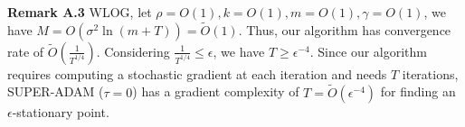 \documentclass{article}
\begin{document}
\textbf{Remark A.3} WLOG, let $\rho = O(1), k = O(1), m = O(1), \gamma = O(1)$, we have $M = O(\sigma^2 \ln(m+T)) = \tilde{O}(1)$. Thus, our algorithm has convergence rate of $\tilde{O}\left(\frac{1}{T^{1/4}}\right)$.
Considering $\frac{1}{T^{1/4}}\leq\epsilon$, we have $T\geq\epsilon^{-4}$. Since our algorithm requires computing a stochastic gradient at each iteration and needs $T$ iterations, SUPER-ADAM ($\tau = 0$) has a gradient complexity of $T = \tilde{O}(\epsilon^{-4})$ for finding an
$\epsilon$-stationary point.
\end{document}
